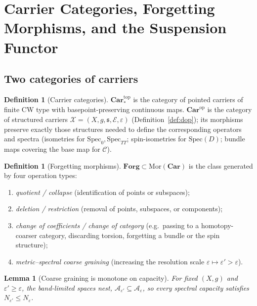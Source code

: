 \documentclass[11pt,a4paper]{article}
\newtheorem{lemma}[theorem]{Lemma}
\theoremstyle{definition}
\newtheorem{definition}[theorem]{Definition}
\theoremstyle{remark}
\newcommand{\Car}{\mathbf{Car}}
\newcommand{\Forg}{\mathbf{Forg}}
\begin{document}
\section{Carrier Categories, Forgetting Morphisms, and the Suspension Functor}
\label{sec:categories}

\subsection{Two categories of carriers}

\begin{definition}[Carrier categories]
\label{def:categories}
$\Car^{\mathrm{top}}_{\ast}$ is the category of pointed carriers of finite CW type with
basepoint-preserving continuous maps.  $\Car^{\mathrm{op}}$ is the category of structured
carriers $\mathcal X=(X,g,\mathfrak s,\mathcal E,\varepsilon)$
(Definition~\ref{def:dop}); its morphisms preserve exactly those structures needed to define
the corresponding operators and spectra (isometries for $\mathrm{Spec}_{0},\mathrm{Spec}_{TT}$;
spin-isometries for $\mathrm{Spec}(D)$; bundle maps covering the base map for $\mathcal C$).
\end{definition}

\begin{definition}[Forgetting morphisms]
\label{def:forg}
$\Forg\subset\mathrm{Mor}(\Car)$ is the class generated by four operation types:
\begin{enumerate}[label=(\roman*)]
\item \emph{quotient / collapse} (identification of points or subspaces);
\item \emph{deletion / restriction} (removal of points, subspaces, or components);
\item \emph{change of coefficients / change of category} (e.g.\ passing to a homotopy-coarser
category, discarding torsion, forgetting a bundle or the spin structure);
\item \emph{metric--spectral coarse graining} (increasing the resolution scale
$\varepsilon\mapsto\varepsilon'>\varepsilon$).
\end{enumerate}
\end{definition}

\begin{lemma}[Coarse graining is monotone on capacity]
\label{lem:coarse}
For fixed $(X,g)$ and $\varepsilon'\ge\varepsilon$, the band-limited spaces nest,
$\mathcal A_{\varepsilon'}\subseteq\mathcal A_{\varepsilon}$, so every spectral capacity
satisfies $N_{\varepsilon'}\le N_{\varepsilon}$.
\end{lemma}
\end{document}
